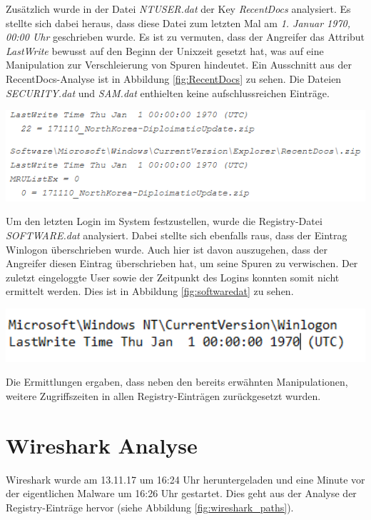Zusätzlich wurde in der Datei \textit{NTUSER.dat} der Key \textit{RecentDocs} analysiert. Es stellte sich dabei heraus, dass diese Datei zum letzten Mal am \textit{1. Januar 1970, 00:00 Uhr} geschrieben wurde.
Es ist zu vermuten, dass der Angreifer das Attribut \textit{LastWrite} bewusst auf den Beginn der Unixzeit gesetzt hat, was auf eine Manipulation zur Verschleierung von Spuren hindeutet.
Ein Ausschnitt aus der RecentDocs-Analyse ist in Abbildung \ref{fig:RecentDocs} zu sehen.
Die Dateien \textit{SECURITY.dat} und \textit{SAM.dat} enthielten keine aufschlussreichen Einträge.

\begin{center}
	\includegraphics[width=15.8cm]{figures/prefetch_manipulation.png}
	\label{fig:RecentDocs}
\end{center}

\newpage
Um den letzten Login im System festzustellen, wurde die Registry-Datei \textit{SOFTWARE.dat} analysiert.
Dabei stellte sich ebenfalls raus, dass der Eintrag Winlogon überschrieben wurde.
Auch hier ist davon auszugehen, dass der Angreifer diesen Eintrag überschrieben hat, um seine Spuren zu verwischen.
Der zuletzt eingeloggte User sowie der Zeitpunkt des Logins konnten somit nicht ermittelt werden. Dies ist in Abbildung \ref{fig:softwaredat} zu sehen.

\begin{center}
	\includegraphics[width=15.8cm]{figures/softwaredat.png}
	\label{fig:softwaredat}
\end{center}

Die Ermittlungen ergaben, dass neben den bereits erwähnten Manipulationen, weitere Zugriffszeiten in allen Registry-Einträgen zurückgesetzt wurden.

\section{Wireshark Analyse}
Wireshark wurde am 13.11.17 um 16:24 Uhr heruntergeladen und eine Minute vor der eigentlichen Malware um 16:26 Uhr gestartet.
Dies geht aus der Analyse der Registry-Einträge hervor (siehe Abbildung \ref{fig:wireshark_paths}).

